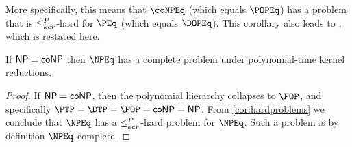 More specifically, this means that $\coNPEq$ (which equals $\POPEq$) has a problem that is $\leq^{P}_{ker}$-hard for $\PEq$ (which equals $\DOPEq$).
This corollary also leads to \autocite[Theorem~8.7, part~1]{bcffm}, which is restated here.

\begin{corollary}
  If ${\mathsf{NP}} = {\mathsf{coNP}}$ then $\NPEq$ has a complete problem under polynomial-time kernel reductions.
\end{corollary}
\begin{proof}
  If ${\mathsf{NP}} = {\mathsf{coNP}}$, then the polynomial hierarchy collapses to $\POP$, and specifically $\PTP = \DTP = \POP = \coNP = \NP$.
  From \autoref{cor:hardproblems} we conclude that $\NPEq$ has a $\leq^{P}_{ker}$-hard problem for $\NPEq$.
  Such a problem is by definition $\NPEq$-complete.
\end{proof}

